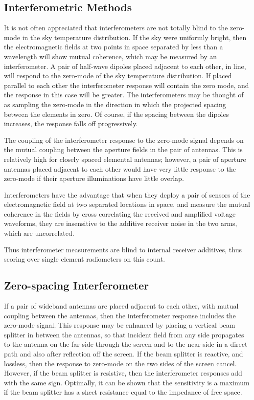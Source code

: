 \subsection{Interferometric Methods}
  
  It is not often appreciated that interferometers are not totally blind to the zero-mode in the sky temperature distribution.  If the sky were uniformly bright, then the electromagnetic fields at two points in space separated by less than a wavelength will show mutual coherence, which may be measured by an interferometer.  A pair of half-wave dipoles placed adjacent to each other, in line, will respond to the zero-mode of the sky temperature distribution.  If placed parallel to each other the interferometer response will contain the zero mode, and the response in this case will be greater.  The interferometers may be thought of as sampling the zero-mode in the direction in which the projected spacing between the elements in zero.  Of course, if the spacing between the dipoles increases, the response falls off progressively.
  
  The coupling of the interferometer response to the zero-mode signal depends on the mutual coupling between the aperture fields in the pair of antennas.  This is relatively high for closely spaced elemental antennas; however, a pair of aperture antennas placed adjacent to each other would have very little response to the zero-mode if their aperture illuminations have little overlap.
  
  Interferometers have the advantage that when they deploy a pair of sensors of the electromagnetic field at two separated locations in space, and measure the mutual coherence in the fields by cross correlating the received and amplified voltage waveforms, they are insensitive to the additive receiver noise in the two arms, which are uncorrelated.  
  
  Thus interferometer measurements are blind to internal receiver additives, thus scoring over single element radiometers on this count.
  
\subsection{Zero-spacing Interferometer}
  
  If a pair of wideband antennas are placed adjacent to each other, with mutual coupling between the antennas, then the interferometer response includes the zero-mode signal.  This response may be enhanced by placing a vertical beam splitter in between the antennas, so that incident field from any side propagates to the antenna on the far side through the screen and to the near side in a direct path and also after reflection off the screen.  If the beam splitter is reactive, and lossless, then the response to zero-mode on the two sides of the screen cancel.  However, if the beam splitter is resistive, then the interferometer responses add with the same sign.  Optimally, it can be shown that the sensitivity is a maximum if the beam splitter has a sheet resistance equal to the impedance of free space.  
  

